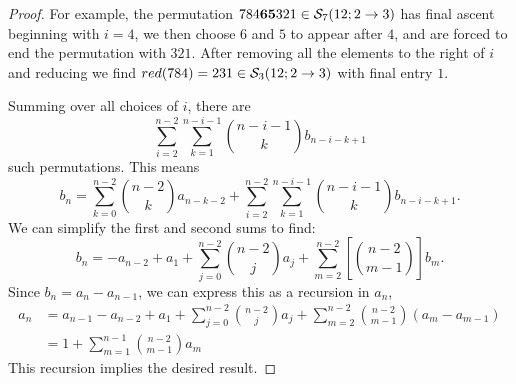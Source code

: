 \documentclass[10pt,a4paper]{amsart}
\renewcommand\S{\mathcal S}
\begin{document}
\begin{proof}
    For example, the permutation $784{\bf 65} 321 \in \S_7(12; 2\to3)$ has final ascent beginning with $i = 4$, we then choose $6$ and $5$ to appear after $4$, and are forced to end the permutation with $321$. After removing all the elements to the right of $i$ and reducing we find ${\rm red}(784) = 231 \in \S_3(12; 2\to3)$ with final entry $1$.

    Summing over all choices of $i$, there are
    \[
    \sum_{i=2}^{n-2} \sum_{k=1}^{n-i-1} \binom{n-i-1}{k} b_{n-i-k+1}
    \]
    such permutations. This means
    \[
    b_n = \sum_{k=0}^{n-2} \binom{n-2}{k} a_{n-k-2} + \sum_{i=2}^{n-2} \sum_{k=1}^{n-i-1} \binom{n-i-1}{k} b_{n-i-k+1}.
    \]
    We can simplify the first and second sums to find:
    \[
    b_n = -a_{n-2} + a_1 + \sum_{j=0}^{n-2} \binom{n-2}{j} a_{j} + \sum_{m=2}^{n-2} \left[\binom{n-2}{m-1}\right]b_m.
    \]
    Since $b_n = a_n - a_{n-1}$, we can express this as a recursion in $a_n$,
    \begin{align*}
    a_n &= a_{n-1} - a_{n-2} + a_1 + \sum_{j=0}^{n-2} \binom{n-2}{j} a_j + \sum_{m=2}^{n-2} \binom{n-2}{m-1}(a_m - a_{m-1})\\
    &= 1 + \sum_{m=1}^{n-1} \binom{n-2}{m-1} a_m
    \end{align*}
    This recursion implies the desired result.
\end{proof}
\end{document}
